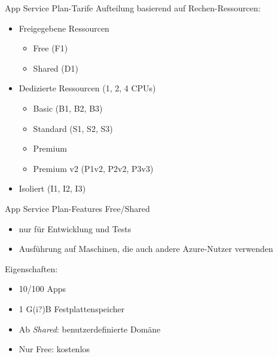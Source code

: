 \begin{flashcard}[Definition]{App Service Plan-Tarife}
    Aufteilung basierend auf Rechen-Ressourcen:
    \begin{itemize}
        \item Freigegebene Ressourcen
            \begin{itemize}
                \item Free (F1)
                \item Shared (D1)
            \end{itemize}
        \item Dedizierte Ressourcen (1, 2, 4 CPUs)
            \begin{itemize}
                \item Basic (B1, B2, B3)
                \item Standard (S1, S2, S3)
                \item Premium
                \item Premium v2 (P1v2, P2v2, P3v3)
            \end{itemize}
        \item Isoliert (I1, I2, I3)
    \end{itemize}
\end{flashcard}

\begin{flashcard}[Definition]{App Service Plan-Features Free/Shared}
    \begin{itemize}
        \item nur für Entwicklung und Tests
        \item Ausführung auf Maschinen, die auch andere Azure-Nutzer verwenden
    \end{itemize}
    Eigenschaften:
    \begin{itemize}
        \item 10/100 Apps
        \item 1 G(i?)B Festplattenspeicher
        \item Ab \emph{Shared}: benutzerdefinierte Domäne
        \item Nur Free: kostenlos
    \end{itemize}
\end{flashcard}

